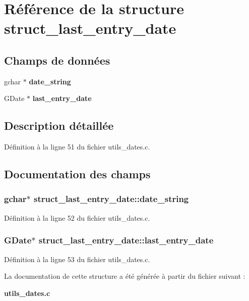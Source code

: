 \section{Référence de la structure struct\_\-last\_\-entry\_\-date}
\label{structstruct__last__entry__date}
\subsection*{Champs de données}
\begin{DoxyCompactItemize}
\item 
gchar $\ast$ {\bf date\_\-string}
\item 
GDate $\ast$ {\bf last\_\-entry\_\-date}
\end{DoxyCompactItemize}


\subsection{Description détaillée}


Définition à la ligne 51 du fichier utils\_\-dates.c.



\subsection{Documentation des champs}
\subsubsection[{date\_\-string}]{\setlength{\rightskip}{0pt plus 5cm}gchar$\ast$ {\bf struct\_\-last\_\-entry\_\-date::date\_\-string}}\label{structstruct__last__entry__date_a5074185074700e91c55afc3b8bbefe0d}


Définition à la ligne 52 du fichier utils\_\-dates.c.

\subsubsection[{last\_\-entry\_\-date}]{\setlength{\rightskip}{0pt plus 5cm}GDate$\ast$ {\bf struct\_\-last\_\-entry\_\-date::last\_\-entry\_\-date}}\label{structstruct__last__entry__date_a484259538f72ed9d250693048e832ba8}


Définition à la ligne 53 du fichier utils\_\-dates.c.



La documentation de cette structure a été générée à partir du fichier suivant :\begin{DoxyCompactItemize}
\item 
{\bf utils\_\-dates.c}\end{DoxyCompactItemize}
